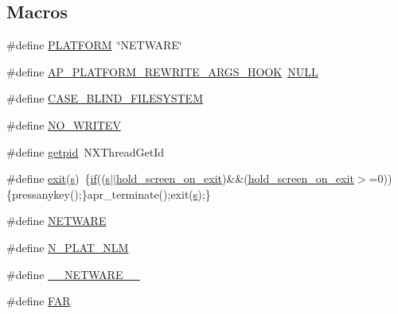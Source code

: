 \subsection*{Macros}
\begin{DoxyCompactItemize}
\item 
\#define \hyperlink{group__APACHE__OS__NETWARE_ga1fa4f1561216be34f745f32aaa38d943}{P\+L\+A\+T\+F\+O\+RM}~\char`\"{}N\+E\+T\+W\+A\+RE\char`\"{}
\item 
\#define \hyperlink{group__APACHE__OS__NETWARE_gafadf468b66524ea08fc3536aead78644}{A\+P\+\_\+\+P\+L\+A\+T\+F\+O\+R\+M\+\_\+\+R\+E\+W\+R\+I\+T\+E\+\_\+\+A\+R\+G\+S\+\_\+\+H\+O\+OK}~\hyperlink{pcre_8txt_ad7f989d16aa8ca809a36bc392c07fba1}{N\+U\+LL}
\item 
\#define \hyperlink{group__APACHE__OS__NETWARE_ga34e00ba2dd9716e8d7f289bf66ce53b6}{C\+A\+S\+E\+\_\+\+B\+L\+I\+N\+D\+\_\+\+F\+I\+L\+E\+S\+Y\+S\+T\+EM}
\item 
\#define \hyperlink{group__APACHE__OS__NETWARE_ga7cb2bc5dd18d959101fbf0fdf47bcbcb}{N\+O\+\_\+\+W\+R\+I\+T\+EV}
\item 
\#define \hyperlink{group__APACHE__OS__NETWARE_gacf2940fe9f29eb438f40629fd4fbb2b6}{getpid}~N\+X\+Thread\+Get\+Id
\item 
\#define \hyperlink{group__APACHE__OS__NETWARE_gaac7f3a566d7243651a356db3fcfef6b1}{exit}(\hyperlink{pcretest_8txt_a062597889ba244b72877454b1d3adecf}{s})~\{\hyperlink{util__expr__scan_8c_aa1a71763978093648dffef60b56f7447}{if}((\hyperlink{pcretest_8txt_a062597889ba244b72877454b1d3adecf}{s}$\vert$$\vert$\hyperlink{group__APACHE__OS__NETWARE_ga8cb457878fc498ef805d17ebc17c9429}{hold\+\_\+screen\+\_\+on\+\_\+exit})\&\&(\hyperlink{group__APACHE__OS__NETWARE_ga8cb457878fc498ef805d17ebc17c9429}{hold\+\_\+screen\+\_\+on\+\_\+exit}$>$=0))\{pressanykey();\}apr\+\_\+terminate();exit(\hyperlink{pcretest_8txt_a062597889ba244b72877454b1d3adecf}{s});\}
\item 
\#define \hyperlink{group__APACHE__OS__NETWARE_ga497861512988123b56cd2e6a2b3df457}{N\+E\+T\+W\+A\+RE}
\item 
\#define \hyperlink{group__APACHE__OS__NETWARE_ga4c1eb1ed6003c699571f92b05b51da46}{N\+\_\+\+P\+L\+A\+T\+\_\+\+N\+LM}
\item 
\#define \hyperlink{group__APACHE__OS__NETWARE_ga0a79e63ae236559ea8edeb74d4a42652}{\+\_\+\+\_\+\+N\+E\+T\+W\+A\+R\+E\+\_\+\+\_\+}
\item 
\#define \hyperlink{group__APACHE__OS__NETWARE_gaef060b3456fdcc093a7210a762d5f2ed}{F\+AR}
\item 
$$
\end{DoxyCompactItemize}
